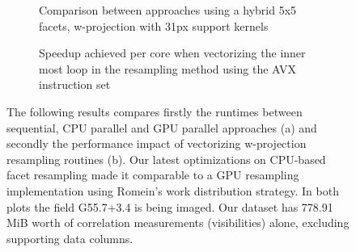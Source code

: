 \documentclass[a4paper,10pt]{article}
\begin{document}
\begin{figure}[h!]
  \begin{subfigure}[b]{0.49\textwidth}
  \centering
  \caption{Comparison between approaches using a hybrid 5x5 facets, w-projection with 31px support kernels}
  \end{subfigure}
  \begin{subfigure}[b]{0.49\textwidth}
    \centering
  \caption{Speedup achieved per core when vectorizing the inner most loop in the resampling method using the AVX instruction set}  
  \end{subfigure}
  \caption[Acceleration Results]{The following results compares firstly the runtimes between sequential, CPU parallel and GPU parallel
    approaches (a) and secondly the performance impact of vectorizing w-projection resampling routines (b). Our latest optimizations
    on CPU-based facet resampling made it comparable to a GPU resampling implementation using Romein's work distribution strategy.
    In both plots the field G55.7+3.4 is being imaged. Our dataset has 778.91 MiB worth of correlation measurements (visibilities) 
    alone, excluding supporting data columns.}
  \label{FIG_RESULTS}
\end{figure}
\end{document}
